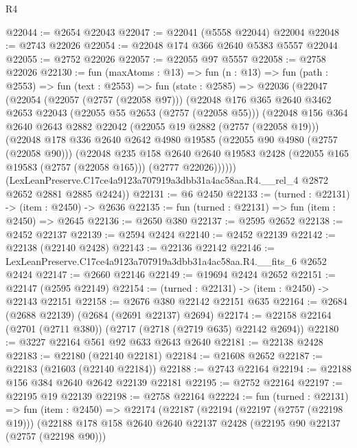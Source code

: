 \begin{lexlean}{R4}
\begin{coremodule}
@22044 := @2654 @22043
@22047 := @22041 (@5558 @22044) @22004
@22048 := @2743 @22026
@22054 := @22048 @174 @366 @2640 @5383 @5557 @22044
@22055 := @2752 @22026
@22057 := @22055 @97 @5557
@22058 := @2758 @22026
@22130 := fun (maxAtoms : @13) =>
  fun (n : @13) =>
  fun (path : @2553) =>
  fun (text : @2553) =>
  fun (state : @2585) =>
  @22036
    (@22047
      (@22054
        (@22057 (@2757 (@22058 @97)))
        (@22048
          @176
          @365
          @2640
          @3462
          @2653
          @22043
          (@22055 @55 @2653 (@2757 (@22058 @55)))
          (@22048
            @156
            @364
            @2640
            @2643
            @2882
            @22042
            (@22055 @19 @2882 (@2757 (@22058 @19)))
            (@22048
              @178
              @336
              @2640
              @2642
              @4980
              @19585
              (@22055 @90 @4980 (@2757 (@22058 @90)))
              (@22048
                @235
                @158
                @2640
                @2640
                @19583
                @2428
                (@22055 @165 @19583 (@2757 (@22058 @165)))
                (@2777 @22026))))))
      (LexLeanPreserve.C17ce4a9123a707919a3dbb31a4ac58aa.R4.__rel_4 @2872 @2652 @2881 @2885 @2424))
@22131 := @6 @2450
@22133 := (turned : @22131) -> (item : @2450) -> @2636
@22135 := fun (turned : @22131) => fun (item : @2450) => @2645
@22136 := @2650 @380
@22137 := @2595 @2652
@22138 := @2452 @22137
@22139 := @2594 @2424
@22140 := @2452 @22139
@22142 := @22138 (@22140 @2428)
@22143 := @22136 @22142
@22146 := LexLeanPreserve.C17ce4a9123a707919a3dbb31a4ac58aa.R4.__fits_6 @2652 @2424
@22147 := @2660 @22146
@22149 := @19694 @2424 @2652
@22151 := @22147 (@2595 @22149)
@22154 := (turned : @22131) -> (item : @2450) -> @22143 @22151
@22158 := @2676 @380 @22142 @22151 @635
@22164 := @2684 (@2688 @22139) (@2684 (@2691 @22137) @2694)
@22174 := @22158 @22164 (@2701 (@2711 @380)) (@2717 (@2718 (@2719 @635) @22142 @2694))
@22180 := @3227 @22164 @561 @92 @633 @2643 @2640
@22181 := @22138 @2428
@22183 := @22180 (@22140 @22181)
@22184 := @21608 @2652
@22187 := @22183 (@21603 (@22140 @22184))
@22188 := @2743 @22164
@22194 := @22188 @156 @384 @2640 @2642 @22139 @22181
@22195 := @2752 @22164
@22197 := @22195 @19 @22139
@22198 := @2758 @22164
@22224 := fun (turned : @22131) =>
  fun (item : @2450) =>
  @22174
    (@22187
      (@22194
        (@22197 (@2757 (@22198 @19)))
        (@22188
          @178
          @158
          @2640
          @2640
          @22137
          @2428
          (@22195 @90 @22137 (@2757 (@22198 @90)))

\end{coremodule}
\end{lexlean}
